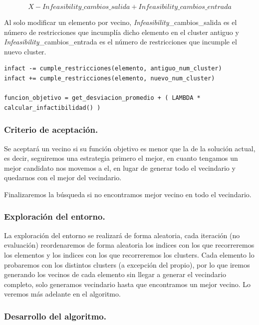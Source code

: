 \documentclass[12pt, spanish]{article}
\begin{document}
$$X - \textit{Infeasibility}\_cambios\_salida + \textit{Infeasibility}\_cambios\_entrada$$
 
 Al solo modificar un elemento por vecino, \textit{Infeasibility}\_cambios\_salida  es el número de restricciones que incumplía dicho elemento en el cluster antiguo y \textit{Infeasibility}\_cambios\_entrada es el número de restricciones que incumple el nuevo cluster.
 
 
 
\begin{lstlisting}
infact -= cumple_restricciones(elemento, antiguo_num_cluster)
infact += cumple_restricciones(elemento, nuevo_num_cluster)

funcion_objetivo = get_desviacion_promedio + ( LAMBDA * calcular_infactibilidad() )
 \end{lstlisting}

\subsubsection{Criterio de aceptación.}

Se aceptará un vecino si su función objetivo es menor que la de la solución actual, es decir, seguiremos una estrategia primero el mejor, en cuanto tengamos un mejor candidato nos movemos a el, en lugar de generar todo el vecindario y quedarnos con el mejor del vecindario.

Finalizaremos la búsqueda si no encontramos mejor vecino en todo el vecindario.

\subsubsection{Exploración del entorno.}

La exploración del entorno se realizará de forma aleatoria, cada iteración (no evaluación) reordenaremos de forma aleatoria los indices con los que recorreremos los elementos y los indices con los que recorreremos los clusters. Cada elemento lo probaremos con los distintos clusters (a excepción del propio), por lo que iremos generando los vecinos de cada elemento sin llegar a generar el vecindario completo, solo generamos vecindario hasta que encontramos un mejor vecino. Lo veremos más adelante en el algoritmo.

\subsubsection{Desarrollo del algoritmo.}
\end{document}
